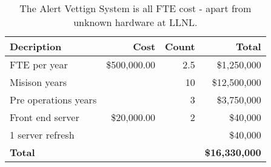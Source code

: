 \tiny \begin{longtable} {|l|r|r|r|} \caption{The Alert Vettign System is all FTE cost - apart from unknown hardware at LLNL. \label{tab:eliminate}}\\ 
\hline 
\textbf{Decription}&\textbf{Cost}&\textbf{Count}&\textbf{Total} \\ \hline
{FTE per year}&{\$500,000.00}&{2.5}&{\$1,250,000} \\ \hline
{Misison years}&{}&{10}&{\$12,500,000} \\ \hline
{Pre operations years}&{}&{3}&{\$3,750,000} \\ \hline
{Front end server}&{\$20,000.00}&{2}&{\$40,000} \\ \hline
{1 server refresh }&{}&{}&{\$40,000} \\ \hline
\textbf{Total}&\textbf{}&\textbf{}&\textbf{\$16,330,000} \\ \hline
\end{longtable} \normalsize
